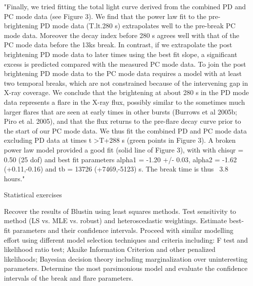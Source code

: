 "Finally, we tried fitting the total light curve derived from the combined PD and PC mode data (see Figure 3). We find that the power law fit to the pre-brightening PD mode data (T.lt.280 s) extrapolates well to the pre-break PC mode data. Moreover the decay index before 280 s agrees well with that of the PC mode data before the 13ks break. In contrast, if we extrapolate the post brightening PD mode data to later times using the best fit slope, a significant excess is predicted compared with the measured PC mode data. To join the post brightening PD mode data to the PC mode data requires a model with at least two temporal breaks, which are not constrained because of the intervening gap in X-ray coverage. We conclude that the brightening at about 280 s in the PD mode data represents a flare in the X-ray flux, possibly similar to the sometimes much larger flares that are seen at early times in other bursts (Burrows et al 2005b; Piro et al. 2005), and that the flux returns to the pre-flare decay curve prior to the start of our PC mode data. We thus fit the combined PD and PC mode data excluding PD data at times t >T+288 s (green points in Figure 3). A broken power law model provided a good fit (solid line of Figure 3), with with chisqr = 0.50 (25 dof) and best fit parameters alpha1 = -1.20 +/- 0.03, alpha2 = -1.62 (+0.11,-0.16) and tb = 13726 (+7469,-5123) s. The break time is thus ~3.8 hours."

Statistical exercises

    Recover the results of Blustin using least squares methods. Test sensitivity to method (LS vs. MLE vs. robust) and heteroscedastic weightings. Estimate best-fit parameters and their confidence intervals.
    Proceed with similar modelling effort using different model selection techniques and criteria including: F test and likelihood ratio test; Akaike Information Criterion and other penalized likelihoods; Bayesian decision theory including marginalization over uninteresting parameters. Determine the most parsimonious model and evaluate the confidence intervals of the break and flare parameters.
